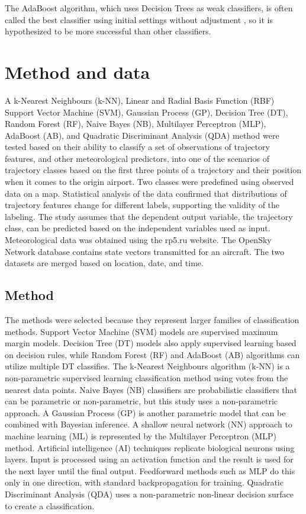 \let\LaTeXcline\cline\documentclass[sn-mathphys-num]{sn-jnl}\let\cline\LaTeXcline
\begin{document}
The AdaBoost algorithm, which uses Decision Trees as weak classifiers, is often called the best classifier using initial settings without adjustment \cite{Kegl2013}, so it is hypothesized to be more successful than other classifiers.

\section{Method and data}
\label{sec:Dataset}

A k-Nearest Neighbours (k-NN), Linear and Radial Basis Function (RBF) Support Vector Machine (SVM), Gaussian Process (GP), Decision Tree (DT), Random Forest (RF), Naive Bayes (NB), Multilayer Perceptron (MLP), AdaBoost (AB), and Quadratic Discriminant Analysis (QDA) method were tested based on their ability to classify a set of observations of trajectory features, and other meteorological predictors, into one of the scenarios of trajectory classes based on the first three points of a trajectory and their position when it comes to the origin airport. Two classes were predefined using observed data on a map. Statistical analysis of the data confirmed that distributions of trajectory features change for different labels, supporting the validity of the labeling. The study assumes that the dependent output variable, the trajectory class, can be predicted based on the independent variables used as input. Meteorological data was obtained using the rp5.ru website. The OpenSky Network database contains state vectors transmitted for an aircraft. The two datasets are merged based on location, date, and time.

\subsection{Method}

The methods were selected because they represent larger families of classification methods. Support Vector Machine (SVM) models are supervised maximum margin models. Decision Tree (DT) models also apply supervised learning based on decision rules, while Random Forest (RF) and AdaBoost (AB) algorithms can utilize multiple DT classifies. The k-Nearest Neighbours algorithm (k-NN) is a non-parametric supervised learning classification method using votes from the nearest data points. Naive Bayes (NB) classifiers are probabilistic classifiers that can be parametric or non-parametric, but this study uses a non-parametric approach. A Gaussian Process (GP) is another parametric model that can be combined with Bayesian inference. A shallow neural network (NN) approach to machine learning (ML) is represented by the Multilayer Perceptron (MLP) method. Artificial intelligence (AI) techniques replicate biological neurons using layers. Input is processed using an activation function and the result is used for the next layer until the final output. Feedforward methods such as MLP do this only in one direction, with standard backpropagation for training. Quadratic Discriminant Analysis (QDA) uses a non-parametric non-linear decision surface to create a classification.
\end{document}
